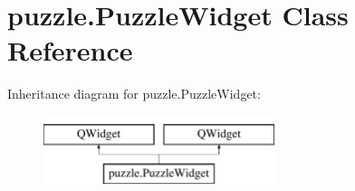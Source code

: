 \hypertarget{classpuzzle_1_1PuzzleWidget}{}\section{puzzle.\+Puzzle\+Widget Class Reference}
\label{classpuzzle_1_1PuzzleWidget}
Inheritance diagram for puzzle.\+Puzzle\+Widget\+:\begin{figure}[H]
\begin{center}
\leavevmode
\includegraphics[height=2.000000cm]{classpuzzle_1_1PuzzleWidget}
\end{center}
\end{figure}
